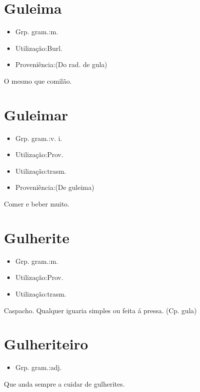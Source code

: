 \section{Guleima}
\begin{itemize}
\item {Grp. gram.:m.}
\end{itemize}
\begin{itemize}
\item {Utilização:Burl.}
\end{itemize}
\begin{itemize}
\item {Proveniência:(Do rad. de \textunderscore gula\textunderscore )}
\end{itemize}
O mesmo que \textunderscore comilão\textunderscore .
\section{Guleimar}
\begin{itemize}
\item {Grp. gram.:v. i.}
\end{itemize}
\begin{itemize}
\item {Utilização:Prov.}
\end{itemize}
\begin{itemize}
\item {Utilização:trasm.}
\end{itemize}
\begin{itemize}
\item {Proveniência:(De \textunderscore guleima\textunderscore )}
\end{itemize}
Comer e beber muito.
\section{Gulherite}
\begin{itemize}
\item {Grp. gram.:m.}
\end{itemize}
\begin{itemize}
\item {Utilização:Prov.}
\end{itemize}
\begin{itemize}
\item {Utilização:trasm.}
\end{itemize}
Caspacho.
Qualquer iguaria simples ou feita á pressa.
(Cp. \textunderscore gula\textunderscore )
\section{Gulheriteiro}
\begin{itemize}
\item {Grp. gram.:adj.}
\end{itemize}
Que anda sempre a cuidar de gulherites.

